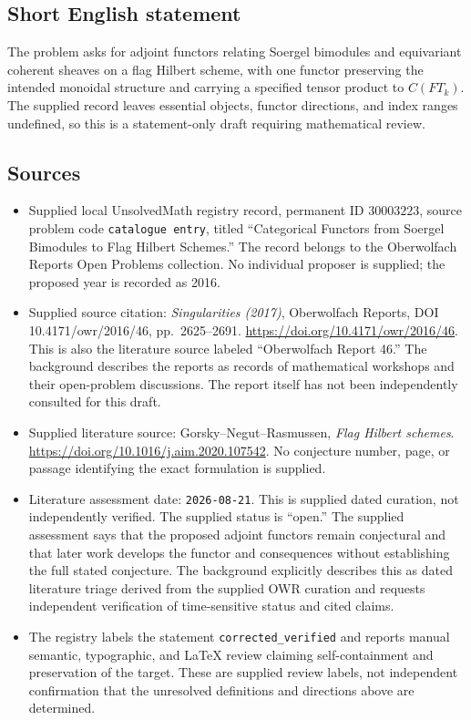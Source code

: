 \documentclass[11pt]{article}
\begin{document}
\subsection{Short English statement}
The problem asks for adjoint functors relating Soergel bimodules and equivariant coherent sheaves on a flag Hilbert scheme, with one functor preserving the intended monoidal structure and carrying a specified tensor product to \(C(FT_k)\). The supplied record leaves essential objects, functor directions, and index ranges undefined, so this is a statement-only draft requiring mathematical review.
\subsection{Sources}
\begin{itemize}
\item Supplied local UnsolvedMath registry record, permanent ID \(30003223\), source problem code \texttt{catalogue entry}, titled ``Categorical Functors from Soergel Bimodules to Flag Hilbert Schemes.'' The record belongs to the Oberwolfach Reports Open Problems collection. No individual proposer is supplied; the proposed year is recorded as 2016.
\item Supplied source citation: \emph{Singularities (2017)}, Oberwolfach Reports, DOI 10.4171/owr/2016/46, pp.\ 2625--2691. \url{https://doi.org/10.4171/owr/2016/46}. This is also the literature source labeled ``Oberwolfach Report 46.'' The background describes the reports as records of mathematical workshops and their open-problem discussions. The report itself has not been independently consulted for this draft.
\item Supplied literature source: Gorsky--Negut--Rasmussen, \emph{Flag Hilbert schemes}. \url{https://doi.org/10.1016/j.aim.2020.107542}. No conjecture number, page, or passage identifying the exact formulation is supplied.
\item Literature assessment date: \texttt{2026-08-21}. This is supplied dated curation, not independently verified. The supplied status is ``open.'' The supplied assessment says that the proposed adjoint functors remain conjectural and that later work develops the functor and consequences without establishing the full stated conjecture. The background explicitly describes this as dated literature triage derived from the supplied OWR curation and requests independent verification of time-sensitive status and cited claims.
\item The registry labels the statement \texttt{corrected\_verified} and reports manual semantic, typographic, and LaTeX review claiming self-containment and preservation of the target. These are supplied review labels, not independent confirmation that the unresolved definitions and directions above are determined.
\end{itemize}
\end{document}
